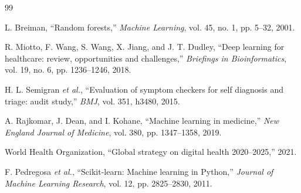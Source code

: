 \documentclass[conference]{IEEEtran}
\begin{document}
\balance

\begin{thebibliography}{99}

L. Breiman, ``Random forests,'' \emph{Machine Learning}, vol. 45, no. 1, pp. 5--32, 2001.

R. Miotto, F. Wang, S. Wang, X. Jiang, and J. T. Dudley, ``Deep learning for healthcare: review, opportunities and challenges,'' \emph{Briefings in Bioinformatics}, vol. 19, no. 6, pp. 1236--1246, 2018.

H. L. Semigran \emph{et al.}, ``Evaluation of symptom checkers for self diagnosis and triage: audit study,'' \emph{BMJ}, vol. 351, h3480, 2015.

A. Rajkomar, J. Dean, and I. Kohane, ``Machine learning in medicine,'' \emph{New England Journal of Medicine}, vol. 380, pp. 1347--1358, 2019.

World Health Organization, ``Global strategy on digital health 2020--2025,'' 2021.

F. Pedregosa \emph{et al.}, ``Scikit-learn: Machine learning in Python,'' \emph{Journal of Machine Learning Research}, vol. 12, pp. 2825--2830, 2011.

\end{thebibliography}
\end{document}

